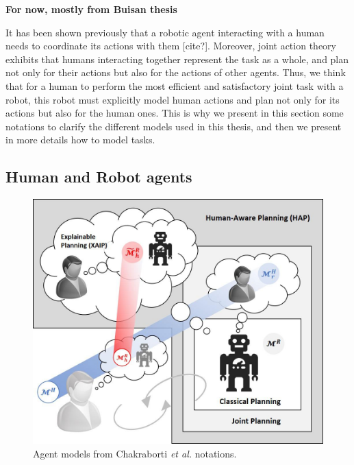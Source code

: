 \textbf{For now, mostly from Buisan thesis}



It has been shown previously that a robotic agent interacting with a human needs to coordinate its actions with them [cite?]. Moreover, joint action theory exhibits that humans interacting together represent the task as a whole, and plan not only for their actions but also for the actions of other agents. Thus, we think that for a human to perform the most efficient and satisfactory joint task with a robot, this robot must explicitly model human actions and plan not only for its actions but also for the human ones. This is why we present in this section some notations to clarify the different models used in this thesis, and then we present in more details how to model tasks.

\subsection{Human and Robot agents}

\begin{figure}
    \centering
    \includegraphics[width=0.8\linewidth]{images/Chapter1/chakraborti_notations.jpg}
    \caption{Agent models from Chakraborti \textit{et al.} notations.}
    \label{fig:chakraborti_notations}
\end{figure}

